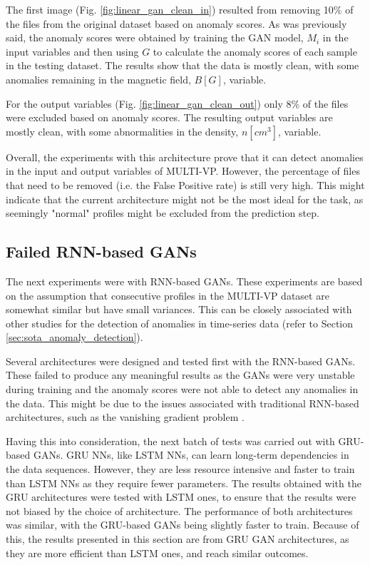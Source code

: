 The first image (Fig. \ref{fig:linear_gan_clean_in}) resulted from removing 10\% of the files from the original dataset based on anomaly scores. As was previously said, the anomaly scores were obtained by training the GAN model, $M_i$ in the input variables and then using $G$ to calculate the anomaly scores of each sample in the testing dataset. The results show that the data is mostly clean, with some anomalies remaining in the magnetic field, $B [G]$, variable.

For the output variables (Fig. \ref{fig:linear_gan_clean_out}) only 8\% of the files were excluded based on anomaly scores. The resulting output variables are mostly clean, with some abnormalities in the density, $n [cm^3]$, variable.

Overall, the experiments with this architecture prove that it can detect anomalies in the input and output variables of MULTI-VP. However, the percentage of files that need to be removed (i.e. the False Positive rate) is still very high. This might indicate that the current architecture might not be the most ideal for the task, as seemingly "normal" profiles might be excluded from the prediction step.


\subsection{Failed RNN-based GANs}\label{sec:gan_experiment_lstm}
The next experiments were with RNN-based GANs. These experiments are based on the assumption that consecutive profiles in the MULTI-VP dataset are somewhat similar but have small variances. This can be closely associated with other studies for the detection of anomalies in time-series data (refer to Section \ref{sec:sota_anomaly_detection}). 

Several architectures were designed and tested first with the RNN-based GANs. These failed to produce any meaningful results as the GANs were very unstable during training and the anomaly scores were not able to detect any anomalies in the data. This might be due to the issues associated with traditional RNN-based architectures, such as the vanishing gradient problem \cite{Schmidt_RecurrentNeuralNetworks_2019}.

Having this into consideration, the next batch of tests was carried out with GRU-based GANs. GRU NNs, like LSTM NNs, can learn long-term dependencies in the data sequences. However, they are less resource intensive and faster to train than LSTM NNs as they require fewer parameters. The results obtained with the GRU architectures were tested with LSTM ones, to ensure that the results were not biased by the choice of architecture. The performance of both architectures was similar, with the GRU-based GANs being slightly faster to train. Because of this, the results presented in this section are from GRU GAN architectures, as they are more efficient than LSTM ones, and reach similar outcomes.

